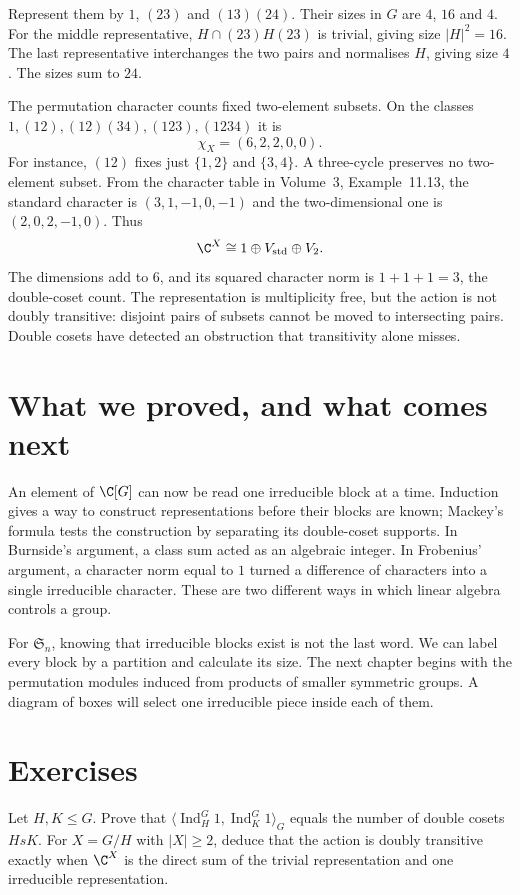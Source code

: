 Represent them by $1$, $(23)$ and $(13)(24)$. Their sizes in $G$ are $4$, $16$ and $4$. For the middle representative, $H\cap(23)H(23)$ is trivial, giving size $|H|^2=16$. The last representative interchanges the two pairs and normalises $H$, giving size $4$. The sizes sum to $24$.

The permutation character counts fixed two-element subsets. On the classes $1,(12),(12)(34),(123),(1234)$ it is
\[
 \chi_X=(6,2,2,0,0).
\]
For instance, $(12)$ fixes just $\{1,2\}$ and $\{3,4\}$. A three-cycle preserves no two-element subset. From the character table in Volume~3, Example~11.13, the standard character is $(3,1,-1,0,-1)$ and the two-dimensional one is $(2,0,2,-1,0)$. Thus
\[
 \C^X\cong1\oplus V_{\mathrm{std}}\oplus V_2.
\]
The dimensions add to $6$, and its squared character norm is $1+1+1=3$, the double-coset count. The representation is multiplicity free, but the action is not doubly transitive: disjoint pairs of subsets cannot be moved to intersecting pairs. Double cosets have detected an obstruction that transitivity alone misses.

\section{What we proved, and what comes next}

An element of $\C[G]$ can now be read one irreducible block at a time. Induction gives a way to construct representations before their blocks are known; Mackey's formula tests the construction by separating its double-coset supports. In Burnside's argument, a class sum acted as an algebraic integer. In Frobenius' argument, a character norm equal to $1$ turned a difference of characters into a single irreducible character. These are two different ways in which linear algebra controls a group.

For $\mathfrak S_n$, knowing that irreducible blocks exist is not the last word. We can label every block by a partition and calculate its size. The next chapter begins with the permutation modules induced from products of smaller symmetric groups. A diagram of boxes will select one irreducible piece inside each of them.

\section{Exercises}

\begin{exercise}[$\star$]\label{ex:doublecosets}
Let $H,K\le G$. Prove that
$\langle\operatorname{Ind}_H^G1,\operatorname{Ind}_K^G1\rangle_G$
equals the number of double cosets $HsK$. For $X=G/H$ with $|X|\ge2$, deduce that the action is doubly transitive exactly when $\C^X$ is the direct sum of the trivial representation and one irreducible representation.
\end{exercise}


